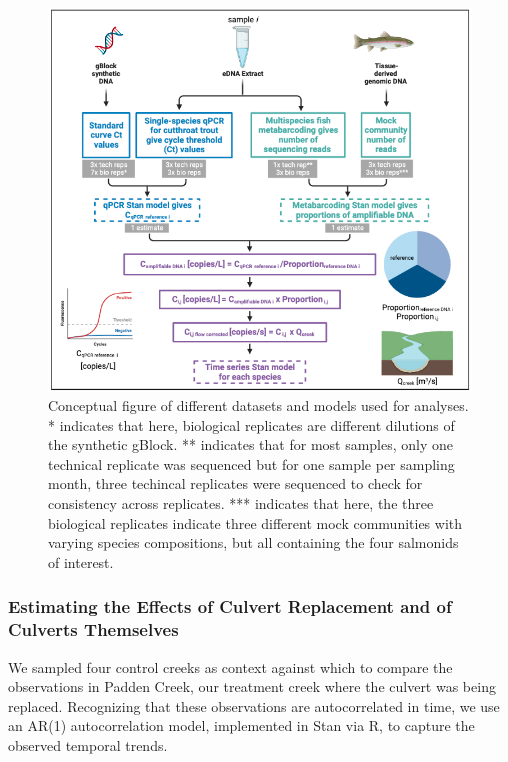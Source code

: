 \documentclass[
]{article}
\begin{document}
\begin{figure}
\centering
\includegraphics{../Output/Figures/conceptual_figure.png}
\caption{Conceptual figure of different datasets and models used for
analyses. * indicates that here, biological replicates are different
dilutions of the synthetic gBlock. ** indicates that for most samples,
only one technical replicate was sequenced but for one sample per
sampling month, three techincal replicates were sequenced to check for
consistency across replicates. *** indicates that here, the three
biological replicates indicate three different mock communities with
varying species compositions, but all containing the four salmonids of
interest.\label{fig:conceptualfig}}
\end{figure}

\hypertarget{estimating-the-effects-of-culvert-replacement-and-of-culverts-themselves}{%
\subsubsection{Estimating the Effects of Culvert Replacement and of
Culverts
Themselves}\label{estimating-the-effects-of-culvert-replacement-and-of-culverts-themselves}}

We sampled four control creeks as context against which to compare the
observations in Padden Creek, our treatment creek where the culvert was
being replaced. Recognizing that these observations are autocorrelated
in time, we use an AR(1) autocorrelation model, implemented in Stan via
R, to capture the observed temporal trends.
\end{document}
